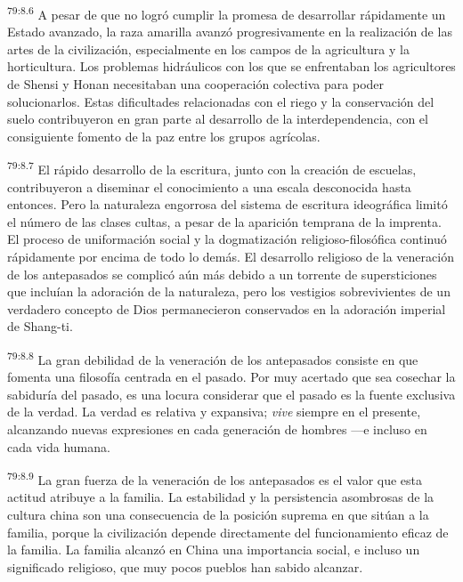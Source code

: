 \par
\textsuperscript{79:8.6} A pesar de que no logró cumplir la promesa de desarrollar rápidamente un Estado avanzado, la raza amarilla avanzó progresivamente en la realización de las artes de la civilización, especialmente en los campos de la agricultura y la horticultura. Los problemas hidráulicos con los que se enfrentaban los agricultores de Shensi y Honan necesitaban una cooperación colectiva para poder solucionarlos. Estas dificultades relacionadas con el riego y la conservación del suelo contribuyeron en gran parte al desarrollo de la interdependencia, con el consiguiente fomento de la paz entre los grupos agrícolas.

\par
\textsuperscript{79:8.7} El rápido desarrollo de la escritura, junto con la creación de escuelas, contribuyeron a diseminar el conocimiento a una escala desconocida hasta entonces. Pero la naturaleza engorrosa del sistema de escritura ideográfica limitó el número de las clases cultas, a pesar de la aparición temprana de la imprenta. El proceso de uniformación social y la dogmatización religioso-filosófica continuó rápidamente por encima de todo lo demás. El desarrollo religioso de la veneración de los antepasados se complicó aún más debido a un torrente de supersticiones que incluían la adoración de la naturaleza, pero los vestigios sobrevivientes de un verdadero concepto de Dios permanecieron conservados en la adoración imperial de Shang-ti.

\par
\textsuperscript{79:8.8} La gran debilidad de la veneración de los antepasados consiste en que fomenta una filosofía centrada en el pasado. Por muy acertado que sea cosechar la sabiduría del pasado, es una locura considerar que el pasado es la fuente exclusiva de la verdad. La verdad es relativa y expansiva; \textit{vive} siempre en el presente, alcanzando nuevas expresiones en cada generación de hombres ---e incluso en cada vida humana.

\par
\textsuperscript{79:8.9} La gran fuerza de la veneración de los antepasados es el valor que esta actitud atribuye a la familia. La estabilidad y la persistencia asombrosas de la cultura china son una consecuencia de la posición suprema en que sitúan a la familia, porque la civilización depende directamente del funcionamiento eficaz de la familia. La familia alcanzó en China una importancia social, e incluso un significado religioso, que muy pocos pueblos han sabido alcanzar.

